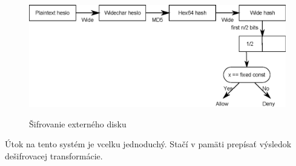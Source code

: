 \begin{figure}[htp]
    \includegraphics[scale=0.75]{img/0/extern_drive_encryption}
\label{fig:extern_drive_encryption}
\caption{Šifrovanie externého disku}
\end{figure}

Útok na tento systém je vcelku jednoduchý. Stačí v pamäti prepísať výsledok dešifrovacej transformácie. 



